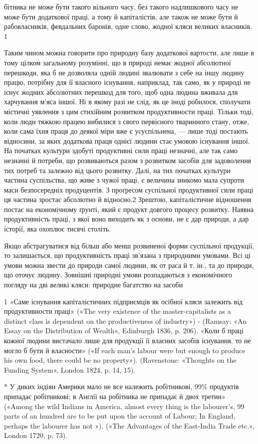 бітника не може бути такого вільного часу, без такого надлишкового
часу не може бути додаткової праці, а тому й капіталістів,
але також не може бути й рабовласників, февдальних баронів,
одне слово, жодної кляси великих власників. 1

Таким чином можна говорити про природну базу додаткової
вартости, але лише в тому цілком загальному розумінні, що в
природі немає жодної абсолютної перешкоди, яка б не дозволяла
одній людині звалювати з себе на іншу людину працю, потрібну
для її власного існування, наприклад, так само, як у природі
не існує жодних абсолютних перешкод для того, щоб одна людина
вживала для харчування м’яса іншої. Ні в якому разі не
слід, як це іноді робилося, сполучати містичні уявлення з
цим стихійним розвитком продуктивности праці. Тільки тоді,
коли люди тяжкою працею вибилися з свого первісного тваринного
стану, отже, коли сама їхня праця до деякої міри вже є
усуспільнена, — лише тоді постають відносини, за яких додаткова
праця однієї людини стає умовою існування іншої. На початках
культури здобуті продуктивні сили праці незначні, але так само
незначні й потреби, що розвиваються разом з розвитком засобів
для задоволення тих потреб та залежно від цього розвитку. Далі,
на тих початках культури частина суспільства, що живе з чужої
праці, є величина зникомо мала супроти маси безпосередніх продуцентів.
З проґресом суспільної продуктивної сили праці ця
частина зростає абсолютно й відносно.2 Зрештою, капіталістичне
відношення постає на економічному ґрунті, який є продукт
довгого процесу розвитку. Наявна продуктивність праці,
з якої воно виходить як з основи, не є дар природи, а дар історії,
яка охоплює тисячі століть.

Якщо абстрагуватися від більш або менш розвиненої форми
суспільної продукції, то залишається, що продуктивність праці
зв’язана з природними умовами. Всі ці умови можна звести до
природи самої людини, як от раса й т. ін., та до природи, що оточує
людину. Зовнішні природні умови розпадаються з економічного
погляду на дві великі кляси: природне багатство на засоби

1 «Саме існування капіталістичних підприємців як осібної кляси
залежить від продуктивности праці» («The very existence of the master-capitalists
as a distinct class is dependent on the productiveness
of industry») - (Ramsay: «An Essay on the Distribution of Wealth»,
Edinburgh 1836, p. 206). «Коли б праці кожної людини вистачало лише
для продукції її власних засобів існування, то не могло б бути й власности»
(«If each man’s labour were but enough to produce his own food,
there could be no property»). (Ravenstone: «Thoughts on the Funding
System», London 1824, p. 14, 15).

* У диких індіян Америки мало не все належить робітникові, 99\%
продуктів припадає робітникові; в Англії на робітника не припадає й
двох третин» («Among the wild Indians in America, almost every thing
is the labourer’s, 99 parts of an hundred are to be put upon the account of
Labour; In England, perhaps the labourer has not »). («The Advantages
of the East-India Trade etc.», London 1720, p. 73).
